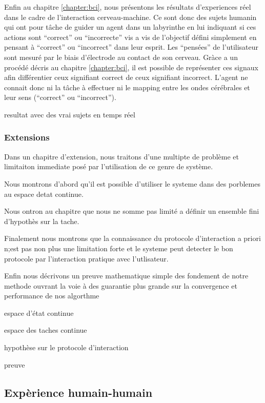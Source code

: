 Enfin au chapitre \ref{chapter:bci}, nous présentons les résultats d'experiences réel dans le cadre de l'interaction cerveau-machine. Ce sont donc des sujets humanin qui ont pour tâche de guider un agent dans un labyrinthe en lui indiquant si ces actions sont ``correct''  ou ``incorrecte'' vis a vis de l'objectif défini simplement en pensant à ``correct'' ou ``incorrect'' dans leur esprit. Les ``pensées'' de l'utilisateur sont mesuré par le biais d'électrode au contact de son cerveau. Gràce a un procédé décris au chapitre \ref{chapter:bci}, il est possible de représenter ces signaux afin différentier ceux signifiant correct de ceux signifiant incorrect. L'agent ne connait donc ni la tâche à effectuer ni le mapping entre les ondes cérébrales et leur sens (``correct'' ou ``incorrect'').

resultat avec des vrai sujets en temps réel

\subsubsection*{Extensions}

Dans un chapitre d'extension, nous traitons d'une multipte de problème et limitaiton immediate posé par l'utilisation de ce genre de système.

Nous montrons d'abord qu'il est possible d'utiliser le systeme dans des porblemes au espace detat continue.

Nous ontron au chapitre que nous ne somme pas limité a définir un ensemble fini d'hypothès sur la tache.

Finalement nous montrons que la connaissance du protocole d'interaction a priori n;est pas non plus une limitation forte et le systeme peut detecter le bon protocole par l'interaction pratique avec l'utlisateur.

Enfin nous décrivons un preuve mathematique simple des fondement de notre methode ouvrant la voie à des guarantie plus grande sur la convergence et performance de nos algorthme


espace d'état continue

espace des taches continue

hypothèse sur le protocole d'interaction

preuve

\subsection*{Expèrience humain-humain}

